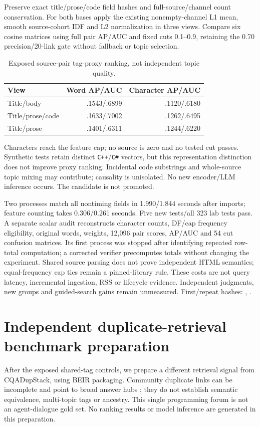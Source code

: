 \documentclass[11pt]{article}
\begin{document}
Preserve exact title/prose/code field hashes and full-source/channel count
conservation. For both bases apply the existing nonempty-channel L1 mean,
smooth source-cohort IDF and L2 normalization in three views. Compare six
cosine matrices using full pair AP/AUC and fixed cuts 0.1--0.9, retaining
the 0.70 precision/20-link gate without fallback or topic selection.
\begin{table}[ht]
\centering\small
\begin{tabular}{lrr}
\toprule
View & Word AP/AUC & Character AP/AUC\\
\midrule
Title/body & .1543/.6899 & .1120/.6180\\
Title/prose/code & .1633/.7002 & .1262/.6495\\
Title/prose & .1401/.6311 & .1244/.6220\\
\bottomrule
\end{tabular}
\caption{Exposed source-pair tag-proxy ranking, not independent topic quality.}
\end{table}
Characters reach the feature cap; no source is zero and no tested cut passes.
Synthetic tests retain distinct \texttt{C++}/\texttt{C\#} vectors, but this
representation distinction does not improve proxy ranking. Incidental code
substrings and whole-source topic mixing may contribute; causality is unisolated.
No new encoder/LLM inference occurs. The candidate is not promoted.

Two processes match all nontiming fields in 1.990/1.844 seconds after imports;
feature counting takes 0.306/0.261 seconds. Five new tests/all 323 lab tests pass.
A separate scalar audit reconstructs character counts, DF/cap frequency
eligibility, original words, weights, 12,096 pair scores, AP/AUC and 54 cut
confusion matrices. Its first process was stopped after identifying repeated
row-total computation; a corrected verifier precomputes totals without changing
the experiment. Shared source parsing does not prove independent HTML semantics;
equal-frequency cap ties remain a pinned-library rule. These costs are not
query latency, incremental ingestion, RSS or lifecycle evidence. Independent
judgments, new groups and guided-search gains remain unmeasured. First/repeat hashes:
,
.

\section{Independent duplicate-retrieval benchmark preparation}
After the exposed shared-tag controls, we prepare a different retrieval signal
from CQADupStack\cite{cqadup2015}, using BEIR packaging\cite{beir2021}.
Community duplicate links can be incomplete and point to broad answer hubs
\cite{cqadupquality2016}; they do not establish semantic equivalence, multi-topic
tags or ancestry. This single programming forum is not an agent-dialogue gold set.
No ranking results or model inference are generated in this preparation.
\end{document}
